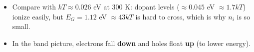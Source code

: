     \begin{handy}
        \begin{itemize}
            \item Compare with $kT \approx 0.026$ eV at 300 K: dopant levels ($\approx0.045$ eV $\approx 1.7kT$) ionize easily, but $E_G = 1.12$ eV $\approx 43kT$ is hard to cross, which is why $n_i$ is so small.
            \item In the band picture, electrons fall \textbf{down} and holes float \textbf{up} (to lower energy).
        \end{itemize}
    \end{handy}
